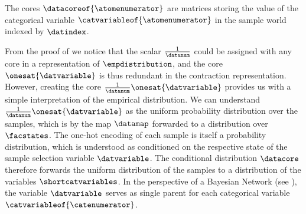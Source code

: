 The cores $\datacoreof{\atomenumerator}$ are matrices storing the value of the categorical variable $\catvariableof{\atomenumerator}$ in the sample world indexed by $\datindex$.

From the proof of  we notice that the scalar $\frac{1}{\datanum}$ could be assigned with any core in a representation of $\empdistribution$, and the core $\onesat{\datvariable}$ is thus redundant in the contraction representation.
However, creating the core $\frac{1}{\datanum}\onesat{\datvariable}$ provides us with a simple interpretation of the empirical distribution.
We can understand $\frac{1}{\datanum}\onesat{\datvariable}$ as the uniform probability distribution over the samples, which is by the map $\datamap$ forwarded to a distribution over $\facstates$.
The one-hot encoding of each sample is itself a probability distribution, which is understood as conditioned on the respective state of the sample selection variable $\datvariable$.
The conditional distribution $\datacore$ therefore forwards the uniform distribution of the samples to a distribution of the variables $\shortcatvariables$.
In the perspective of a Bayesian Network (see ), the variable $\datvariable$ serves as single parent for each categorical variable $\catvariableof{\catenumerator}$.






